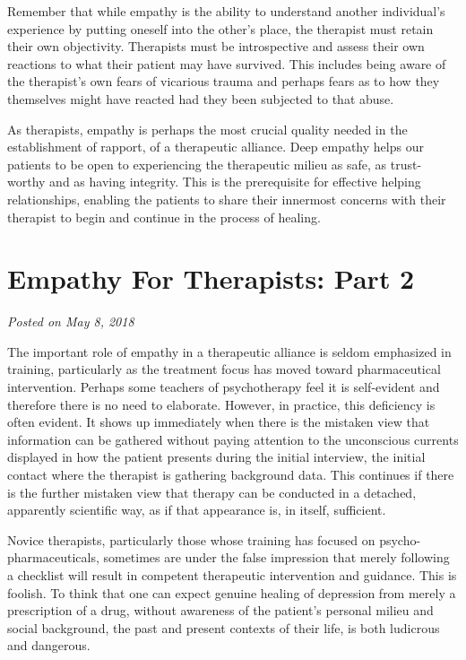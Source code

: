 \documentclass[]{book}
\begin{document}
Remember that while empathy is the ability to understand another individual's experience by putting oneself into the other's place, the therapist must retain their own objectivity. Therapists must be introspective and assess their own reactions to what their patient may have survived. This includes being aware of the therapist's own fears of vicarious trauma and perhaps fears as to how they themselves might have reacted had they been subjected to that abuse.

As therapists, empathy is perhaps the most crucial quality needed in the establishment of rapport, of a therapeutic alliance. Deep empathy helps our patients to be open to experiencing the therapeutic milieu as safe, as trust-worthy and as having integrity. This is the prerequisite for effective helping relationships, enabling the patients to share their innermost concerns with their therapist to begin and continue in the process of healing.

\hypertarget{empathy-for-therapists-part-2}{%
\section{Empathy For Therapists: Part 2}\label{empathy-for-therapists-part-2}}

\emph{Posted on May 8, 2018}

The important role of empathy in a therapeutic alliance is seldom emphasized in training, particularly as the treatment focus has moved toward pharmaceutical intervention. Perhaps some teachers of psychotherapy feel it is self-evident and therefore there is no need to elaborate. However, in practice, this deficiency is often evident. It shows up immediately when there is the mistaken view that information can be gathered without paying attention to the unconscious currents displayed in how the patient presents during the initial interview, the initial contact where the therapist is gathering background data. This continues if there is the further mistaken view that therapy can be conducted in a detached, apparently scientific way, as if that appearance is, in itself, sufficient.

Novice therapists, particularly those whose training has focused on psycho-pharmaceuticals, sometimes are under the false impression that merely following a checklist will result in competent therapeutic intervention and guidance. This is foolish. To think that one can expect genuine healing of depression from merely a prescription of a drug, without awareness of the patient's personal milieu and social background, the past and present contexts of their life, is both ludicrous and dangerous.
\end{document}
